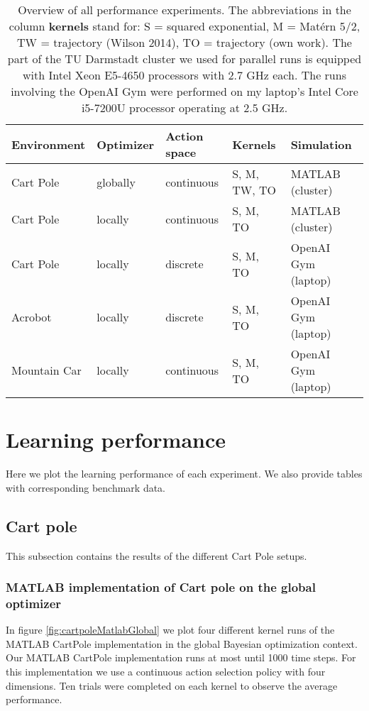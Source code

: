 \begin{table}[h]
    \centering
    \begin{tabular}{|l|l|l|l|l|}\hline
        Environment & Optimizer & Action space & Kernels & Simulation\\\hline
        Cart Pole & globally & continuous & S, M, TW, TO & MATLAB (cluster)\\\hline
        Cart Pole & locally & continuous & S, M, TO & MATLAB (cluster)\\\hline
        Cart Pole & locally & discrete & S, M, TO & OpenAI Gym (laptop)\\\hline
        Acrobot & locally & discrete & S, M, TO & OpenAI Gym (laptop)\\\hline
        Mountain Car & locally & continuous & S, M, TO & OpenAI Gym (laptop)\\\hline
    \end{tabular}
    \caption{Overview of all performance experiments. The abbreviations in the column \textbf{kernels} stand for: S = squared exponential, M = Matérn 5/2, TW = trajectory (Wilson 2014), TO = trajectory (own work). The part of the TU Darmstadt cluster we used for parallel runs is equipped with Intel Xeon E5-4650 processors with 2.7 GHz each. The runs involving the OpenAI Gym were performed on my laptop's Intel Core i5-7200U processor operating at 2.5 GHz.\label{table:xps}}
\end{table}

\newpage
\section{Learning performance}

Here we plot the learning performance of each experiment. We also provide tables with corresponding benchmark data.

\subsection{Cart pole}
This subsection contains the results of the different Cart Pole setups.

\subsubsection{MATLAB implementation of Cart pole on the global optimizer}

In figure \ref{fig:cartpoleMatlabGlobal} we plot four different kernel runs of the MATLAB CartPole implementation in the global Bayesian optimization context. Our MATLAB CartPole implementation runs at most until 1000 time steps. For this implementation we use a continuous action selection policy with four dimensions. Ten trials were completed on each kernel to observe the average performance.

